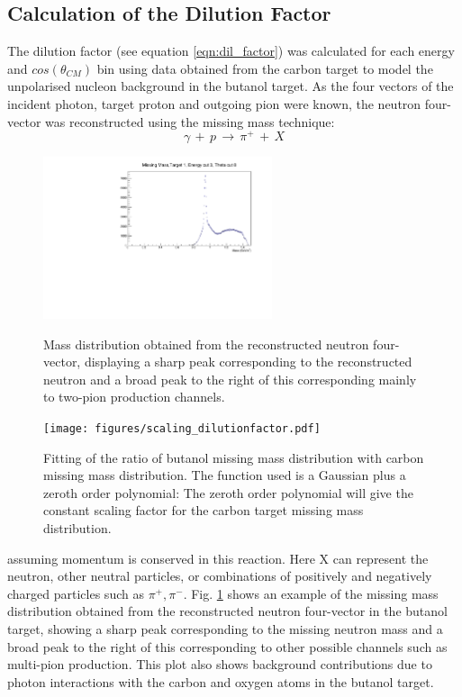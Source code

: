 \subsection{Calculation of the Dilution Factor}
\label{ch:dil_factor}
The dilution factor (see equation \ref{eqn:dil_factor}) was calculated for each energy and $cos(\theta_{CM})$ bin using data obtained from the carbon target to model the unpolarised nucleon background in the butanol target.
As the four vectors of the incident photon, target proton and outgoing pion were known, the neutron four-vector was reconstructed using the missing mass technique:
$$
\gamma \, + \,  p \, \rightarrow \, \pi^+ \, + \, X
$$
\begin{figure}[H]
  \begin{center}
    \includegraphics[width=0.6\textwidth]{figures/neutron_missingmass.pdf} \\
    \caption{Mass distribution obtained from the reconstructed neutron four-vector, displaying a sharp peak corresponding to the reconstructed neutron and
a broad peak to the right of this corresponding mainly to two-pion production channels. }
    \label{fig:frost_neutronmissing_ex}
  \end{center}
\end{figure}
\begin{figure}[H]
  \begin{center}
    \texttt{[image: figures/scaling\_dilutionfactor.pdf]} \\
    \caption{Fitting of the ratio of butanol missing mass distribution with carbon missing mass distribution. The function used is a Gaussian plus a zeroth order polynomial: The zeroth order polynomial will give the constant scaling factor for the carbon target missing mass distribution. }
    \label{fig:scaling_dilutionfactor}
  \end{center}
\end{figure}
assuming momentum is conserved in this reaction. Here X can represent the neutron, other neutral particles, or combinations of positively and negatively charged particles such as $\pi^+ , \pi^-$. Fig. \ref{fig:frost_neutronmissing_ex} shows an example of the missing mass distribution obtained from the reconstructed neutron four-vector in the butanol target, showing a sharp peak corresponding to the missing neutron mass and a broad peak to the right of this corresponding to other possible channels such as multi-pion production. This plot also shows background contributions due to photon interactions with the carbon and oxygen atoms in the butanol target.
